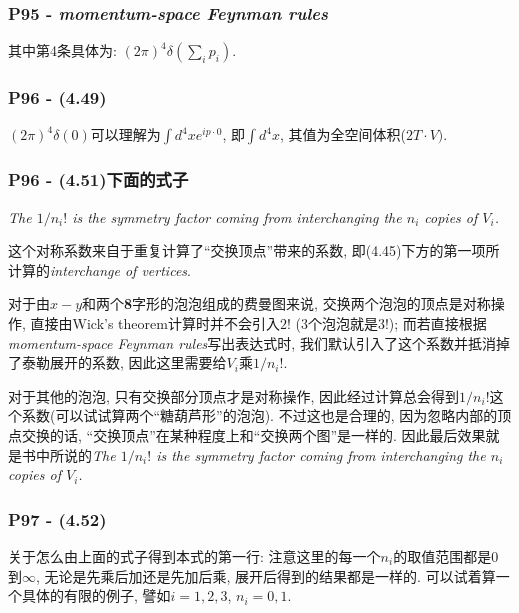 \documentclass[cn,hazy,blue,11pt,device=normal,chinesefont=founder]{elegantnote}
\begin{document}
\subsubsection{P95 - \textit{momentum-space Feynman rules}}

其中第4条具体为: $(2\pi)^4 \delta(\sum\limits_i p_i)$. 

\subsubsection{P96 - (4.49)}

$(2\pi)^4 \delta(0)$可以理解为$\int d^4x e^{ip\cdot 0}$, 即$\int d^4x$, 其值为全空间体积($2T\cdot V)$. 

\subsubsection{P96 - (4.51)下面的式子}

\textit{The $1/n_i !$ is the symmetry factor coming from interchanging the $n_i$ copies of $V_i$.}
\begin{remark}[个人理解]\mbox{}
  
  这个对称系数来自于重复计算了“交换顶点”带来的系数, 即(4.45)下方的第一项所计算的\textit{interchange of vertices}. 

  对于由$x-y$和两个\textbf{8}字形的泡泡组成的费曼图来说, 交换两个泡泡的顶点是对称操作, 直接由Wick's theorem计算时并不会引入$2!$ (3个泡泡就是$3!$); 而若直接根据\textit{momentum-space Feynman rules}写出表达式时, 我们默认引入了这个系数并抵消掉了泰勒展开的系数, 因此这里需要给$V_i$乘$1/n_i !$. 

  对于其他的泡泡, 只有交换部分顶点才是对称操作, 因此经过计算总会得到$1/n_i !$这个系数(可以试试算两个“糖葫芦形”的泡泡). 不过这也是合理的, 因为忽略内部的顶点交换的话, “交换顶点”在某种程度上和“交换两个图”是一样的. 因此最后效果就是书中所说的\textit{The $1/n_i !$ is the symmetry factor coming from interchanging the $n_i$ copies of $V_i$.}

\end{remark}

\subsubsection{P97 - (4.52)}

关于怎么由上面的式子得到本式的第一行: 注意这里的每一个$n_i$的取值范围都是0到$\infty$, 无论是先乘后加还是先加后乘, 展开后得到的结果都是一样的. 可以试着算一个具体的有限的例子, 譬如$i = 1, 2, 3$, $n_i = 0, 1$.   
\end{document}
